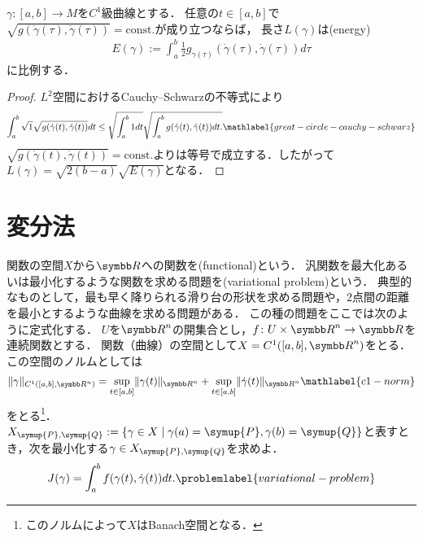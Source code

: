 \documentclass{ltjsarticle}
\begin{document}
\begin{thmbox}
\begin{proposition}
\(\gamma \colon [a, b] \to M\)を\(C^1\)級曲線とする．
任意の\(t \in [a, b]\)で\(\sqrt{g(\dot{\gamma}(\tau), \dot{\gamma}(\tau))} = \mathrm{const.}\)が成り立つならば，
長さ\(L(\gamma)\)は(energy)
\begin{align*}
    E(\gamma) := \int_{a}^{b} \frac{1}{2} g_{\gamma(\tau)}(\dot{\gamma}(\tau), \dot{\gamma}(\tau)) d\tau
\end{align*}
に比例する．
\end{proposition}
\end{thmbox}

\begin{proof}
\(L^2\)空間におけるCauchy--Schwarzの不等式により
\begin{gather}
    \int_{a}^{b} \sqrt{1} \sqrt{g(\dot{\gamma}(t), \dot{\gamma}(t))} dt
    \leq
    \sqrt{\int_a^b 1 dt}
    \sqrt{%
        \int_{a}^{b} g(\dot{\gamma}(t), \dot{\gamma}(t)) dt.
    }
    \mathlabel{great-circle-cauchy-schwarz}
\end{gather}
\(\sqrt{g(\dot{\gamma}(t), \dot{\gamma}(t))} = \mathrm{const.}\)よりは等号で成立する．したがって\(L(\gamma) = \sqrt{2 (b - a)}\sqrt{E(\gamma)} \)となる．
\end{proof}


\section{変分法}
関数の空間\(X\)から\({\Real}\)への関数を(functional)という．
汎関数を最大化あるいは最小化するような関数を求める問題を(variational problem)という．
典型的なものとして，最も早く降りられる滑り台の形状を求める問題や，\(2\)点間の距離を最小とするような曲線を求める問題がある．
この種の問題をここでは次のように定式化する．
\(U\)を\({\Real}^n\)の開集合とし，\(f \colon U \times {\Real}^n \to {\Real}\)を連続関数とする．
関数（曲線）の空間として\(X = C^1([a, b], {\Real}^n)\)をとる．
この空間のノルムとしては
\begin{align}
    \lVert \gamma \rVert_{C^1([a, b], {\Real}^n)} =
    \sup_{t \in [a, b]} \lVert \gamma(t) \rVert_{{\Real}^n} + \sup_{t \in [a, b]} \lVert \dot{\gamma}(t) \rVert_{{\Real}^n}
    \mathlabel{c1-norm}
\end{align}
をとる\footnote{このノルムによって\(X\)はBanach空間となる．}．
\(X_{\symup{P}, \symup{Q}} := \{\gamma \in X \mid \gamma(a) = \symup{P}, \gamma(b) = \symup{Q}\}\)と表すとき，次を最小化する\(\gamma \in X_{\symup{P}, \symup{Q}}\)を求めよ．
\begin{align}
    J(\gamma) = \int_a^b f(\gamma(t), \dot{\gamma}(t))dt. \problemlabel{variational-problem}
\end{align}
\end{document}
